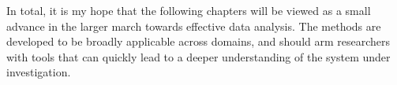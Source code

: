 In total, it is my hope that the following chapters will be viewed as
a small advance in the larger march towards effective data
analysis. The methods are developed to be broadly applicable across
domains, and should arm researchers with tools that can quickly lead
to a deeper understanding of the system under investigation.
















